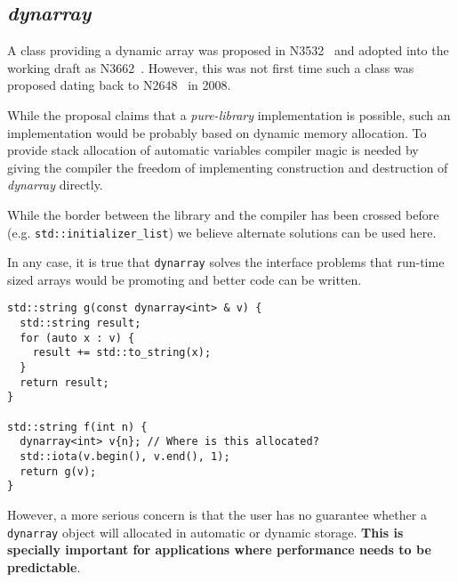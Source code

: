 \subsection{\emph{dynarray}}

A class providing a dynamic array was proposed in N3532~\cite{n3532} and adopted
into the working draft as N3662~\cite{n3662}. However, this was not first time
such a class was proposed dating back to N2648~\cite{n2648} in 2008.

While the proposal claims that a \emph{pure-library} implementation is possible,
such an implementation would be probably based on dynamic memory allocation. To
provide stack allocation of automatic variables compiler magic is needed by
giving the compiler the freedom of implementing construction and destruction of
\emph{dynarray} directly.

While the border between the library and the compiler has been crossed before
(e.g. \verb+std::initializer_list+) we believe alternate solutions can be used
here. 

In any case, it is true that \verb+dynarray+ solves the interface problems that
run-time sized arrays would be promoting and better code can be written.

\begin{lstlisting}
std::string g(const dynarray<int> & v) {
  std::string result;
  for (auto x : v) {
    result += std::to_string(x);
  }
  return result;
}

std::string f(int n) {
  dynarray<int> v{n}; // Where is this allocated?
  std::iota(v.begin(), v.end(), 1);
  return g(v);
} 
\end{lstlisting}

However, a more serious concern is that the user has no guarantee whether
a \verb+dynarray+ object will allocated in automatic or dynamic storage.
\textbf{This is specially important for applications where performance 
needs to be predictable}.
